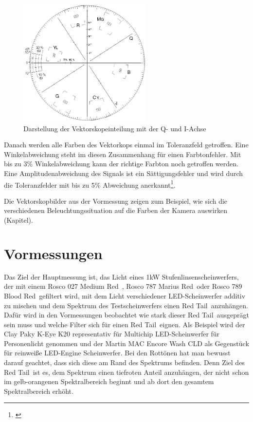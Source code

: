 \begin{figure}[H]     %
\centering
\includegraphics[width=0.6\textwidth]{bilder/vektorskop} 
\caption {Darstellung der Vektorskopeinteilung mit der Q- und I-Achse\protect\footnotemark}\label{b_vektorskop}
\end{figure}

Danach werden alle Farben des Vektorkops einmal im Toleranzfeld getroffen. Eine Winkelabweichung steht im diesen Zusammenhang für einen Farbtonfehler. Mit bis zu 3\% Winkelabweichung kann der richtige Farbton noch getroffen werden. Eine Amplitudenabweichung des Signals ist ein Sättigungsfehler und wird durch die Toleranzfelder mit bis zu 5\% Abweichung anerkannt\footnote{\cite[114]{schmidt}}.

Die Vektorskopbilder aus der Vormessung zeigen zum Beispiel, wie sich die verschiedenen Beleuchtungssituation auf die Farben der Kamera auswirken (Kapitel).

\chapter{Vormessungen}

Das Ziel der Hauptmessung ist, das Licht eines 1kW Stufenlinsenscheinwerfers, der mit einem Rosco 027 \glqq Medium Red\grqq\ , Rosco 787 \glqq Marius Red\grqq\ oder Rosco 789 \glqq Blood Red\grqq\ gefiltert wird, mit dem Licht verschiedener LED-Scheinwerfer additiv zu mischen und dem Spektrum des Testscheinwerfers einen \glqq Red Tail\grqq\ anzuhängen. 
Dafür wird in den Vormessungen beobachtet wie stark dieser \glqq Red Tail\grqq\ ausgeprägt sein muss und welche Filter sich für einen \glqq Red Tail\grqq\ eignen.   
Als Beispiel wird der Clay Paky K-Eye K20 representativ für Multichip LED-Scheinwerfer für Personenlicht genommen und der Martin MAC Encore Wash CLD als Gegenstück für reinweiße LED-Engine Scheinwerfer. 
Bei den Rottönen hat man bewusst darauf geachtet, dass sich diese am Rand des Spektrums befinden. Denn Ziel des \glqq Red Tail\grqq\ ist es, dem Spektrum einen tiefroten Anteil anzuhängen, der nicht schon im gelb-orangenen Spektralbereich beginnt und ab dort den gesamtem Spektralbereich erhöht.  


